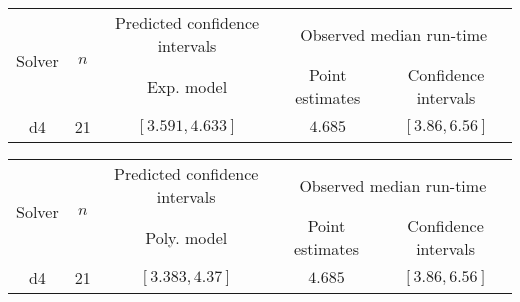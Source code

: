 \begin{tabular}{ccccc}
\hline 
\multirow{2}{*}{Solver} & \multirow{2}{*}{$n$} & Predicted confidence intervals & \multicolumn{2}{c}{Observed median  run-time}\tabularnewline
 &  & Exp. model  & Point estimates  & Confidence intervals\tabularnewline
\hline 
\hline 
\multirow{0}{*}{d4} & 21 & $\mathbf{\left[3.591,4.633\right]}$ & $4.685$ & $\left[3.86,6.56\right]$ \tabularnewline 
\hline 
\end{tabular} 

\begin{tabular}{ccccc}
\hline 
\multirow{2}{*}{Solver} & \multirow{2}{*}{$n$} & Predicted confidence intervals & \multicolumn{2}{c}{Observed median  run-time}\tabularnewline
 &  & Poly. model  & Point estimates  & Confidence intervals\tabularnewline
\hline 
\hline 
\multirow{0}{*}{d4} & 21 & $\mathbf{\left[3.383,4.37\right]}$ & $4.685$ & $\left[3.86,6.56\right]$ \tabularnewline 
\hline 
\end{tabular} 


